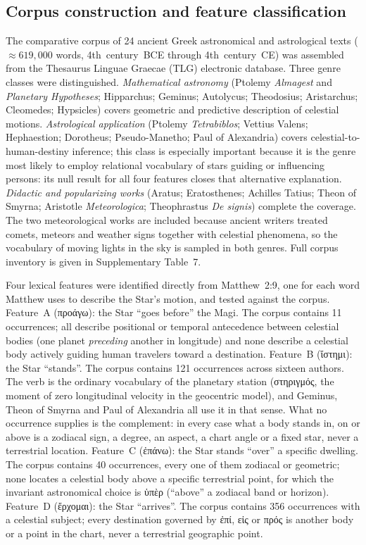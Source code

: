 \documentclass[sn-nature]{sn-jnl}
\newcommand{\grk}[1]{{\fontencoding{LGR}\selectfont #1}}
\newcommand{\grk}[1]{{\greekfont #1}}
\begin{document}
\subsection{Corpus construction and feature classification}
\label{subsec:corpus_methods}

The comparative corpus of 24 ancient Greek astronomical and astrological
texts ($\approx\!619{,}000$ words, 4th~century~BCE through 4th~century~CE)
was assembled from the Thesaurus Linguae Graecae (TLG) electronic
database\cite{tlg}. Three genre classes were distinguished.
\textit{Mathematical astronomy} (Ptolemy \textit{Almagest} and
\textit{Planetary Hypotheses}; Hipparchus; Geminus; Autolycus; Theodosius;
Aristarchus; Cleomedes; Hypsicles) covers geometric and predictive description
of celestial motions. \textit{Astrological application} (Ptolemy
\textit{Tetrabiblos}; Vettius Valens; Hephaestion; Dorotheus;
Pseudo-Manetho; Paul of Alexandria) covers celestial-to-human-destiny
inference; this class is especially important because it is the genre most
likely to employ relational vocabulary of stars guiding or influencing
persons: its null result for all four features closes that alternative
explanation. \textit{Didactic and popularizing works} (Aratus; Eratosthenes;
Achilles Tatius; Theon of Smyrna; Aristotle \textit{Meteorologica};
Theophrastus \textit{De signis}) complete the coverage. The two meteorological
works are included because ancient writers treated comets, meteors and weather
signs together with celestial phenomena, so the vocabulary of moving lights in
the sky is sampled in both genres. Full corpus inventory is given in
Supplementary Table~7.

Four lexical features were identified directly from Matthew~2:9, one for each
word Matthew uses to describe the Star's motion, and tested against the corpus.
Feature~A (\grk{προάγω}): the Star ``goes before'' the Magi. The corpus
contains 11 occurrences; all describe positional or temporal
antecedence between celestial bodies (one planet \textit{preceding} another
in longitude) and none describe a celestial body actively guiding human
travelers toward a destination. Feature~B (\grk{ἵστημι}): the Star
``stands''. The corpus contains 121 occurrences across sixteen authors. The
verb is the ordinary vocabulary of the planetary station (\grk{στηριγμός}, the
moment of zero longitudinal velocity in the geocentric model), and Geminus,
Theon of Smyrna and Paul of Alexandria all use it in that sense. What no
occurrence supplies is the complement: in every case what a body stands in, on
or above is a zodiacal sign, a degree, an aspect, a chart angle or a fixed
star, never a terrestrial location. Feature~C (\grk{ἐπάνω}): the Star stands
``over'' a specific dwelling. The corpus contains 40 occurrences, every one of
them zodiacal or geometric; none locates a celestial body above a specific
terrestrial point, for which the invariant astronomical choice is
\grk{ὑπὲρ} (``above'' a zodiacal band or horizon).
Feature~D (\grk{ἔρχομαι}): the Star ``arrives''. The corpus contains 356
occurrences with a celestial subject; every destination governed by
\grk{ἐπί}, \grk{εἰς} or \grk{πρός} is another body or a point in the chart,
never a terrestrial geographic point.
\end{document}
